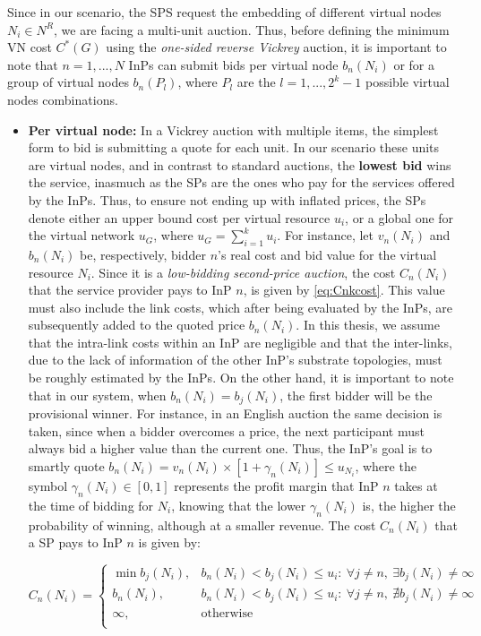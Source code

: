 Since in our scenario, the SPS request the embedding of different virtual nodes $N_i \in N^{R}$, we are facing a multi-unit auction. Thus, before defining the minimum VN cost $C^{*}(G)$ using the \textit{one-sided reverse Vickrey} auction, it is important to note that $n = 1,...,N$ InPs can submit bids per virtual node $b_n(N_i)$ or for a group of virtual nodes $b_n(P_l)$, where $P_l$ are the $l = 1,...,2^{k}-1$ possible virtual nodes combinations. 

\begin{itemize}
    \item \textbf{Per virtual node:} In a Vickrey auction with multiple items, the simplest form to bid is submitting a quote for each unit. In our scenario these units are virtual nodes, and in contrast to standard auctions, the \textbf{lowest bid} wins the service, inasmuch as the SPs are the ones who pay for the services offered by the InPs. Thus, to ensure not ending up with inflated prices, the SPs denote either an upper bound cost per virtual resource $u_{i}$, or a global one for the virtual network $u_{G}$, where $u_{G} = \sum_{i=1}^{k}u_i$. For instance, let $v_n(N_i)$ and $b_n(N_i)$ be, respectively, bidder $n$'s real cost and bid value for the virtual resource $N_i$. Since it is a \textit{low-bidding second-price auction}, the cost $C_n(N_i)$ that the service provider pays to InP $n$, is given by \eqref{eq:Cnkcost}. This value must also include the link costs, which after being evaluated by the InPs, are subsequently added to the quoted price $b_n(N_i)$. In this thesis, we assume that the intra-link costs within an InP are negligible and that the inter-links, due to the lack of information of the other InP's substrate topologies, must be roughly estimated by the InPs. On the other hand, it is important to note that in our system, when $b_n(N_i) = b_j(N_i)$, the first bidder will be the provisional winner. For instance, in an English auction the same decision is taken, since when a bidder overcomes a price, the next participant must always bid a higher value than the current one. Thus, the InP's goal is to smartly quote $b_n(N_i) = v_n(N_i) \times [1 + \gamma_n(N_i)] \leq u_{N_i}$, where the symbol $\gamma_n(N_i) \in [0,1]$ represents the profit margin that InP $n$ takes at the time of bidding for $N_i$, knowing that the lower $\gamma_n(N_i)$ is, the higher the probability of winning, although at a smaller revenue. The cost $C_n(N_i)$ that a SP pays to InP $n$ is given by:

   \begin{equation} \label{eq:Cnkcost}
   C_n(N_i) =
   \begin{cases}
    \min b_j(N_i), & b_n(N_i) < b_j(N_i) \leq u_{i} : \ \forall j \neq n, \ \exists b_j(N_i) \neq \infty \\
    b_n(N_i), & b_n(N_i) < b_j(N_i) \leq u_{i}: \ \forall j \neq n, \ \nexists b_j(N_i) \neq \infty \\
    \infty, & \text{otherwise } \\
  \end{cases}   
   \end{equation}
   

\end{itemize}
